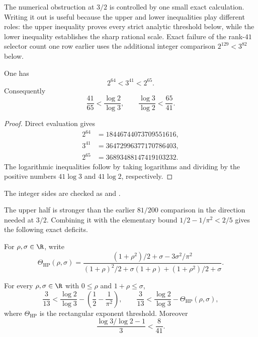 The numerical obstruction at $3/2$ is controlled by one small exact
calculation.  Writing it out is useful because the upper and lower inequalities
play different roles: the upper inequality proves every strict analytic
threshold below, while the lower inequality establishes the sharp rational
scale.  Exact failure of the rank-$41$ selector count one row earlier uses the
additional integer comparison $2^{129}<3^{82}$ below.

\begin{theorem}\label{long1049:res:powerbracket}
One has
\[
 2^{64}<3^{41}<2^{65}.
\]
Consequently
\[
 \frac{41}{65}<\frac{\log2}{\log3},
 \qquad
 \frac{\log3}{\log2}<\frac{65}{41}.
\]
\end{theorem}

\begin{proof}
Direct evaluation gives
\[
 \begin{aligned}
 2^{64}&=18446744073709551616,\\
 3^{41}&=36472996377170786403,\\
 2^{65}&=36893488147419103232.
 \end{aligned}
\]
The logarithmic inequalities follow by taking logarithms and dividing by the
positive numbers $41\log3$ and $41\log2$, respectively.
\end{proof}

\noindent The integer sides are checked as
and
.

The upper half is stronger than the earlier $81/200$ comparison in the
direction needed at $3/2$.  Combining it with the elementary bound
$1/2-1/\pi^2<2/5$ gives the following exact deficits.

For $\rho,\sigma\in\R$, write
\[
 \Theta_{\mathrm{HP}}(\rho,\sigma)=
 \frac{(1+\rho^2)/2+\sigma-3\sigma^2/\pi^2}
 {(1+\rho)^2/2+\sigma(1+\rho)+(1+\rho^2)/2+\sigma}.
\]

\begin{corollary}\label{long1049:res:sharpgaps}
For every $\rho,\sigma\in\R$ with $0\le\rho$ and $1+\rho\le\sigma$,
\[
 \frac3{13}<\frac{\log2}{\log3}
   -\left(\frac12-\frac1{\pi^2}\right),
 \qquad
 \frac3{13}<\frac{\log2}{\log3}-\Theta_{\mathrm{HP}}(\rho,\sigma),
\]
where $\Theta_{\mathrm{HP}}$ is the rectangular exponent threshold.  Moreover
\[
 \frac{\log3/\log2-1}{3}<\frac8{41}.
\]
\end{corollary}

